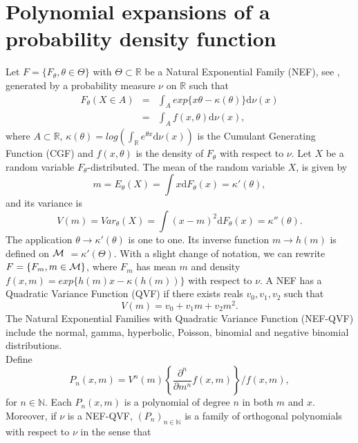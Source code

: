 \section{Polynomial expansions of a probability density function}
Let $F=\{F_{\theta},\theta\in\Theta\}$ with $\Theta\subset \mathbb{R}$ be a Natural Exponential Family (NEF), see \citet{Ba78}, generated by a probability measure $\nu$ on $\mathbb{R}$ such that
\begin{eqnarray*}
F_{\theta}(X\in A)&=&\int_{A}exp\{x\theta-\kappa(\theta)\}\text{d}\nu(x)\\
&=&\int_{A}f(x,\theta)\text{d}\nu(x),
\end{eqnarray*}
where $A\subset\mathbb{R}$, $\kappa(\theta)=log\left(\int_{\mathbb{R}}e^{\theta x}\text{d}\nu(x)\right)$ is the Cumulant Generating Function (CGF) and $f(x,\theta)$ is the density of $F_{\theta}$ with respect to $\nu$.
Let $X$ be a random variable  $F_{\theta}$-distributed. The mean of the random variable $X$, is given by
\begin{equation*}
m=E_{\theta}(X)=\int x\text{d}F_{\theta}(x)=\kappa'(\theta),
\end{equation*}
and its variance is
\begin{equation}
V(m)=Var_{\theta}(X)=\int (x-m)^{2}\text{d}F_{\theta}(x)=\kappa''(\theta).\label{Variance}
\end{equation}
The application $\theta\rightarrow\kappa'(\theta)$ is one to one. Its inverse function $m\rightarrow h(m)$ is defined on $\cal{M}$ $=\kappa'(\Theta)$. With a slight change of notation, we can rewrite $F=\{F_{m},m \in\cal{M}\}$, where $F_{m}$ has mean $m$ and density $f(x,m)=exp\{h(m)x-\kappa(h(m))\}$ with respect to $\nu$. A NEF has a Quadratic Variance Function (QVF) if there exists reals $v_0, v_1, v_2$ such that 
\begin{equation}\label{QVF}
V(m)=v_{0}+v_{1}m+v_{2}m^{2}.
\end{equation}
The Natural Exponential Families with Quadratic Variance Function (NEF-QVF) include the normal, gamma, hyperbolic, Poisson, binomial and negative binomial distributions.\\
Define
\begin{equation}\label{Poly1}
P_{n}(x,m)=V^{n}(m)\left\{\frac{\partial^{n}}{\partial m^{n}}f(x,m)\right\}/f(x,m),
\end{equation}
for $n\in\mathbb{N}$. Each $P_{n}(x,m)$ is a polynomial of degree $n$ in both $m$ and $x$. Moreover, if $\nu$ is a NEF-QVF, $(P_{n})_{n\in\mathbb{N}}$ is a family of orthogonal polynomials with respect to $\nu$ in the sense that
